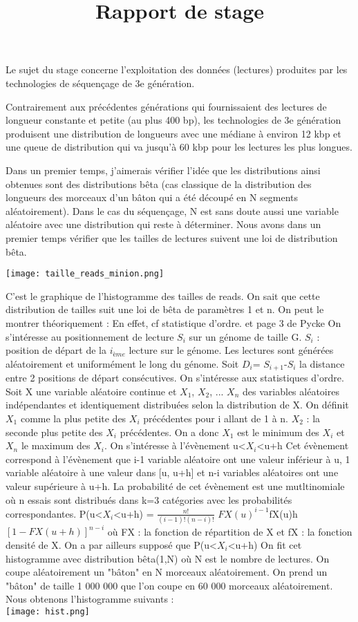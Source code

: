 \documentclass[12pt]{article}
\begin{document}
\title{Rapport de stage}
\maketitle


Le  sujet du stage concerne l'exploitation des données (lectures)
produites par les technologies de séquençage de 3e génération.

Contrairement aux précédentes générations qui fournissaient des lectures
de longueur constante et petite (au plus 400 bp), les technologies de 3e
génération produisent une distribution de longueurs avec une médiane à
environ 12 kbp et une queue de distribution qui va jusqu'à 60 kbp pour les
lectures les plus longues.

Dans un premier temps, j'aimerais vérifier l'idée que les distributions ainsi obtenues sont des distributions bêta (cas classique de la distribution
des longueurs des morceaux d'un bâton qui a été découpé en N segments
aléatoirement). Dans le cas du séquençage, N est sans doute aussi une
variable aléatoire avec une distribution qui reste à déterminer.
Nous avons dans un premier temps vérifier que les tailles de lectures suivent une loi de distribution bêta.

\texttt{[image: taille\_reads\_minion.png]} 

C'est le graphique de l'histogramme des tailles de reads.
On sait que cette distribution de tailles suit une loi de bêta de paramètres 1 et n.
On peut le montrer théoriquement :
En effet, cf statistique d'ordre. et page 3 de Pycke
On s'intéresse au positionnement de lecture $S_{i}$ sur un génome de taille G. $S_{i}$ : position de départ de la $i_{ème}$ lecture sur le génome.
Les lectures sont générées aléatoirement et uniformément le long du génome.
Soit $D_{i}$= $S_{i+1}$-$S_{i}$ la distance entre 2 positions de départ consécutives.
On s'intéresse aux statistiques d'ordre.
Soit X une variable aléatoire continue et $X_{1}$, $X_{2}$, ... $X_{n}$ des variables aléatoires indépendantes et identiquement distribuées selon la distribution de X.
On définit $X_{1}$ comme la plus petite des $X_{i}$ précédentes pour i allant de 1 à n.
$X_{2}$ : la seconde plus petite des $X_{i}$ précédentes.
On a donc $X_{1}$ est le minimum des $X_{i}$ et $X_{n}$ le maximum des $X_{i}$.
On s'intéresse à l'évènement u<$X_{i}$<u+h
Cet évènement correspond à l'évènement que i-1 variable aléatoire ont une valeur inférieur à u, 1 variable aléatoire à une valeur dans [u, u+h] et n-i variables aléatoires ont une valeur supérieure à u+h.
La probabilité de cet évènement est une mutltinomiale où n essais sont distribués dans k=3 catégories avec les probabilités correspondantes.
P(u<$X_{i}$<u+h) = $\frac{n!}{(i-1)!(n-i)!}$ $FX(u)^{i-1}$fX(u)h$[1-FX(u+h)]^{n-i}$
où FX : la fonction de répartition de X
et fX : la fonction densité de X.
On a par ailleurs supposé que P(u<$X_{i}$<u+h)
On fit cet histogramme avec distribution bêta(1,N) où N est le nombre de lectures.
On coupe aléatoirement un "bâton" en N morceaux aléatoirement.
On prend un "bâton" de taille 1 000 000 que l'on coupe en 60 000 morceaux aléatoirement. Nous obtenons l'histogramme suivants : \\
\texttt{[image: hist.png]}
\end{document}
